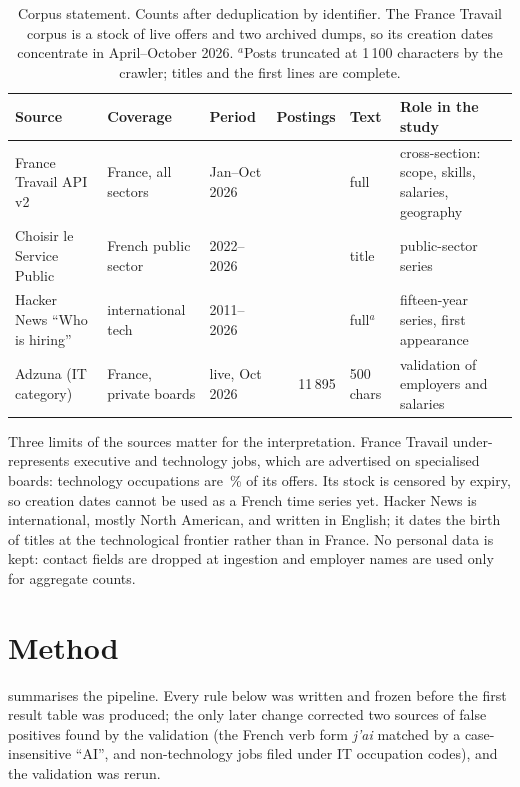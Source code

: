 \documentclass[3p,times,10pt,authoryear]{elsarticle}
\begin{document}
\begin{table}[t]
\centering\footnotesize
\caption{Corpus statement. Counts after deduplication by identifier. The France Travail corpus is a stock of live offers and two archived dumps, so its creation dates concentrate in April--October 2026. $^{a}$Posts truncated at 1\,100 characters by the crawler; titles and the first lines are complete.}\label{tab:corpus}
\begin{tabularx}{\textwidth}{@{}lllrlX@{}}
\toprule
Source & Coverage & Period & Postings & Text & Role in the study\\
\midrule
France Travail API v2 & France, all sectors & Jan--Oct 2026 & \nFT{} & full & cross-section: scope, skills, salaries, geography\\
Choisir le Service Public & French public sector & 2022--2026 & \nCSP{} & title & public-sector series\\
Hacker News ``Who is hiring'' & international tech & 2011--2026 & \nHN{} & full$^{a}$ & fifteen-year series, first appearance\\
Adzuna (IT category) & France, private boards & live, Oct 2026 & 11\,895 & 500 chars & validation of employers and salaries\\
\bottomrule
\end{tabularx}
\end{table}

Three limits of the sources matter for the interpretation. France Travail under-represents executive and technology jobs, which are advertised on specialised boards: technology occupations are \pTech\,\% of its offers. Its stock is censored by expiry, so creation dates cannot be used as a French time series yet. Hacker News is international, mostly North American, and written in English; it dates the birth of titles at the technological frontier rather than in France. No personal data is kept: contact fields are dropped at ingestion and employer names are used only for aggregate counts.

\section{Method}\label{sec:method}
 summarises the pipeline. Every rule below was written and frozen before the first result table was produced; the only later change corrected two sources of false positives found by the validation (the French verb form \emph{j'ai} matched by a case-insensitive ``AI'', and non-technology jobs filed under IT occupation codes), and the validation was rerun.
\end{document}
